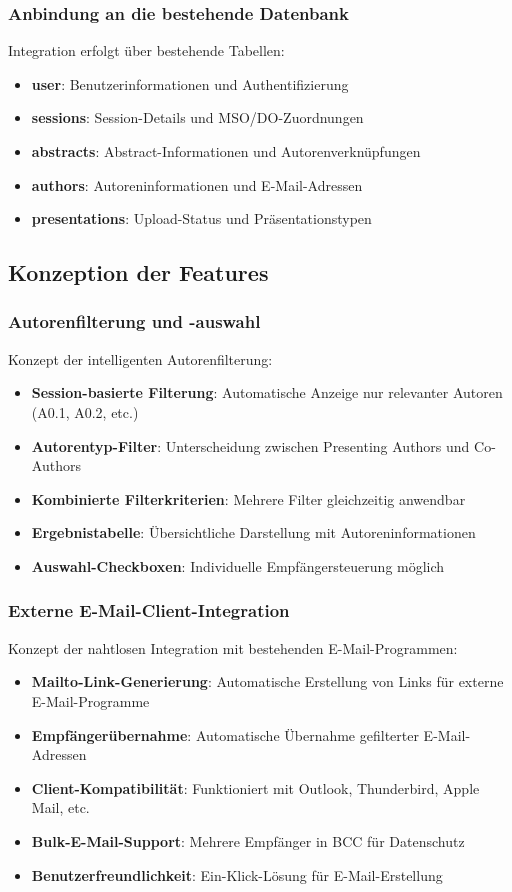 \documentclass[11pt,a4paper]{article}
\begin{document}
\subsubsection{Anbindung an die bestehende Datenbank}
Integration erfolgt über bestehende Tabellen:
\begin{itemize}
    \item \textbf{user}: Benutzerinformationen und Authentifizierung
    \item \textbf{sessions}: Session-Details und MSO/DO-Zuordnungen
    \item \textbf{abstracts}: Abstract-Informationen und Autorenverknüpfungen
    \item \textbf{authors}: Autoreninformationen und E-Mail-Adressen
    \item \textbf{presentations}: Upload-Status und Präsentationstypen
\end{itemize}

\subsection{Konzeption der Features}

\subsubsection{Autorenfilterung und -auswahl}
Konzept der intelligenten Autorenfilterung:
\begin{itemize}
    \item \textbf{Session-basierte Filterung}: Automatische Anzeige nur relevanter Autoren (A0.1, A0.2, etc.)
    \item \textbf{Autorentyp-Filter}: Unterscheidung zwischen Presenting Authors und Co-Authors
    \item \textbf{Kombinierte Filterkriterien}: Mehrere Filter gleichzeitig anwendbar
    \item \textbf{Ergebnistabelle}: Übersichtliche Darstellung mit Autoreninformationen
    \item \textbf{Auswahl-Checkboxen}: Individuelle Empfängersteuerung möglich
\end{itemize}

\subsubsection{Externe E-Mail-Client-Integration}
Konzept der nahtlosen Integration mit bestehenden E-Mail-Programmen:
\begin{itemize}
    \item \textbf{Mailto-Link-Generierung}: Automatische Erstellung von Links für externe E-Mail-Programme
    \item \textbf{Empfängerübernahme}: Automatische Übernahme gefilterter E-Mail-Adressen
    \item \textbf{Client-Kompatibilität}: Funktioniert mit Outlook, Thunderbird, Apple Mail, etc.
    \item \textbf{Bulk-E-Mail-Support}: Mehrere Empfänger in BCC für Datenschutz
    \item \textbf{Benutzerfreundlichkeit}: Ein-Klick-Lösung für E-Mail-Erstellung
\end{itemize}
\end{document}
